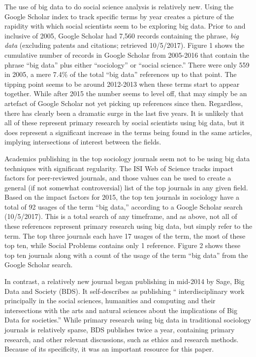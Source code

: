 \documentclass[sigconf]{acmart}
\begin{document}
The use of big data to do social science analysis is relatively new.  Using the Google Scholar index to track specific terms by year creates a picture of the rapidity with which social scientists seem to be exploring big data.  Prior to and inclusive of 2005, Google Scholar had 7,560 records containing the phrase, {\em big data} (excluding patents and citations; retrieved 10/5/2017).  Figure 1 shows the cumulative number of records in Google Scholar from 2005-2016 that contain the phrase “big data” plus either “sociology” or “social science.”  There were only 559 in 2005, a mere 7.4\% of the total “big data” references up to that point.  The tipping point seems to be around 2012-2013 when these terms start to appear together.  While after 2015 the number seems to level off, that may simply be an artefact of Google Scholar not yet picking up references since then.  Regardless, there has clearly been a dramatic surge in the last five years.  It is unlikely that all of these represent primary research by social scientists using big data, but it does represent a significant increase in the terms being found in the same articles, implying intersections of interest between the fields.    

Academics publishing in the top sociology journals seem not to be using big data techniques with significant regularity.  The ISI Web of Science tracks impact factors for peer-reviewed journals, and those values can be used to create a general (if not somewhat controversial) list of the top journals in any given field.  Based on the impact factors for 2015, the top ten journals in sociology have a total of 92 usages of the term “big data,” according to a Google Scholar search (10/5/2017).  This is a total search of any timeframe, and as above, not all of these references represent primary research using big data, but simply refer to the term.   The top three journals each have 17 usages of the term, the most of these top ten, while Social Problems contains only 1 reference.  Figure 2 shows these top ten journals along with a count of the usage of the term “big data” from the Google Scholar search.  

In contrast, a relatively new journal began publishing in mid-2014 by Sage, Big Data and Society (BDS).  It self-describes as publishing “ interdisciplinary work principally in the social sciences, humanities and computing and their intersections with the arts and natural sciences about the implications of Big Data for societies.”  While primary research using big data in traditional sociology journals is relatively sparse, BDS publishes twice a year, containing primary research, and other relevant discussions, such as ethics and research methods.  Because of its specificity, it was an important resource for this paper.
\end{document}
